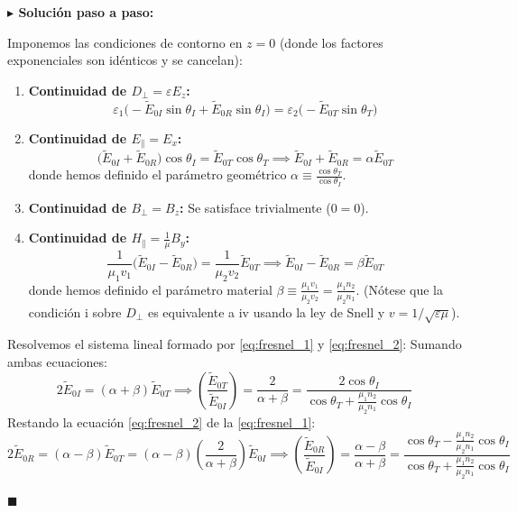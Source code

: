 \documentclass[11pt,a4paper]{book}
\newenvironment{solucion}{%
    \par\medskip\noindent\textbf{\color{blue!65!black}\Large $\blacktriangleright$ Solución paso a paso:}\par\medskip
}{%
    \hfill$\blacksquare$\par\bigskip
}
\begin{document}
\begin{solucion}
Imponemos las condiciones de contorno en $z = 0$ (donde los factores exponenciales son idénticos y se cancelan):
\begin{enumerate}[label=\roman*)]
    \item \textbf{Continuidad de $D_\perp = \varepsilon E_z$:}
    \begin{equation}
        \varepsilon_1\big(-\tilde{E}_{0I}\sin\theta_I + \tilde{E}_{0R}\sin\theta_I\big) = \varepsilon_2\big(-\tilde{E}_{0T}\sin\theta_T\big)
    \end{equation}
    \item \textbf{Continuidad de $E_\parallel = E_x$:}
    \begin{equation}
        \big(\tilde{E}_{0I} + \tilde{E}_{0R}\big)\cos\theta_I = \tilde{E}_{0T}\cos\theta_T \implies \tilde{E}_{0I} + \tilde{E}_{0R} = \alpha \tilde{E}_{0T} \label{eq:fresnel_1}
    \end{equation}
    donde hemos definido el parámetro geométrico $\alpha \equiv \frac{\cos\theta_T}{\cos\theta_I}$.
    \item \textbf{Continuidad de $B_\perp = B_z$:} Se satisface trivialmente ($0 = 0$).
    \item \textbf{Continuidad de $H_\parallel = \frac{1}{\mu}B_y$:}
    \begin{equation}
        \frac{1}{\mu_1 v_1}\big(\tilde{E}_{0I} - \tilde{E}_{0R}\big) = \frac{1}{\mu_2 v_2}\tilde{E}_{0T} \implies \tilde{E}_{0I} - \tilde{E}_{0R} = \beta \tilde{E}_{0T} \label{eq:fresnel_2}
    \end{equation}
    donde hemos definido el parámetro material $\beta \equiv \frac{\mu_1 v_1}{\mu_2 v_2} = \frac{\mu_1 n_2}{\mu_2 n_1}$. (Nótese que la condición i sobre $D_\perp$ es equivalente a iv usando la ley de Snell y $v = 1/\sqrt{\varepsilon\mu}$).
\end{enumerate}

Resolvemos el sistema lineal formado por \eqref{eq:fresnel_1} y \eqref{eq:fresnel_2}:
Sumando ambas ecuaciones:
\begin{equation}
    2\tilde{E}_{0I} = (\alpha + \beta)\tilde{E}_{0T} \implies \left(\frac{\tilde{E}_{0T}}{\tilde{E}_{0I}}\right) = \frac{2}{\alpha + \beta} = \frac{2\cos\theta_I}{\cos\theta_T + \frac{\mu_1 n_2}{\mu_2 n_1}\cos\theta_I}
\end{equation}
Restando la ecuación \eqref{eq:fresnel_2} de la \eqref{eq:fresnel_1}:
\begin{equation}
    2\tilde{E}_{0R} = (\alpha - \beta)\tilde{E}_{0T} = (\alpha - \beta)\left(\frac{2}{\alpha + \beta}\right)\tilde{E}_{0I} \implies \left(\frac{\tilde{E}_{0R}}{\tilde{E}_{0I}}\right) = \frac{\alpha - \beta}{\alpha + \beta} = \frac{\cos\theta_T - \frac{\mu_1 n_2}{\mu_2 n_1}\cos\theta_I}{\cos\theta_T + \frac{\mu_1 n_2}{\mu_2 n_1}\cos\theta_I}
\end{equation}


\end{solucion}
\end{document}
